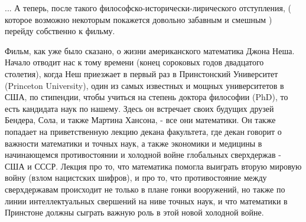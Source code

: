... А теперь, после такого философско-исторически-лирического отступления, (
которое возможно некоторым покажется довольно забавным и смешным ) перейду
собственно к фильму.

Фильм, как уже было сказано, о жизни американского математика Джона Неша.
Начало отводит нас к тому времени (конец сороковых годов двадцатого столетия),
когда Неш приезжает в первый раз в Принстонский Университет (Princeton
University), один из самых известных и мощных университетов в США, по
стипендии, чтобы учиться на степень доктора философии (PhD), то есть кандидата
наук по нашему.  Здесь он встречает своих будущих друзей Бендера, Сола, и также
Мартина Хансона, - все они математики. Он также попадает на приветственную
лекцию декана факультета, где декан говорит о важности математики и точных
наук, а также экономики и медицины в начинающемся противостоянии и холодной
войне глобальных сверхдержав - США и СССР.  Лекция про то, что математика
помогла выиграть вторую мировую войну (взлом нацистских шифров), и про то, что
противостояние между сверхдержавам происходит не только в плане гонки
вооружений, но также по линии интеллектуальных свершений на ниве точных наук, и
что математики в Принстоне должны сыграть важную роль в этой новой холодной
войне. 


